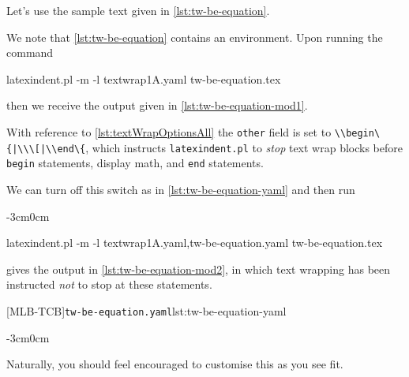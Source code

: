 \documentclass[10pt]{article}
\newenvironment{widepage}{\begin{adjustwidth}{-3cm}{0cm}}{\end{adjustwidth}}
\begin{document}
 \begin{example}
 Let's use the sample text given in \cref{lst:tw-be-equation}.  


 We note that \cref{lst:tw-be-equation} contains an environment. Upon running the command

 \begin{commandshell}
latexindent.pl -m -l textwrap1A.yaml tw-be-equation.tex
\end{commandshell}

 then we receive the output given in \cref{lst:tw-be-equation-mod1}.


 With reference to \vref{lst:textWrapOptionsAll} the \texttt{other} field is set to
 \lstinline!\\begin\{|\\\[|\\end\{!, which instructs \texttt{latexindent.pl} to
 \emph{stop} text wrap blocks before \texttt{begin} statements, display math, and
 \texttt{end} statements.

 We can turn off this switch as in \cref{lst:tw-be-equation-yaml} and then run
 \begin{widepage}

  \begin{commandshell}
latexindent.pl -m -l textwrap1A.yaml,tw-be-equation.yaml tw-be-equation.tex
\end{commandshell}

 \end{widepage}
 gives the output in \cref{lst:tw-be-equation-mod2}, in which text wrapping has been
 instructed \emph{not} to stop at these statements.

 [MLB-TCB]{\texttt{tw-be-equation.yaml}}{lst:tw-be-equation-yaml}

 \begin{widepage}
 \end{widepage}

 Naturally, you should feel encouraged to customise this as you see fit.
 \end{example}
\end{document}
